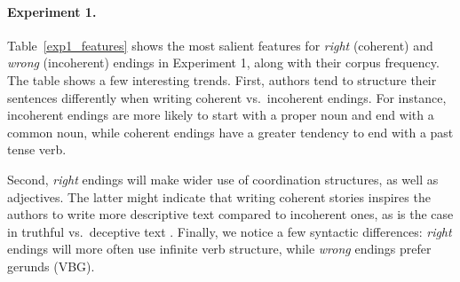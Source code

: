 \documentclass[11pt,a4paper]{article}
\newcommand{\tabref}[1]{Table~\ref{#1}}
\newcommand{\com}[1]{}
\newcommand{\resolved}[1]{}
\newcommand{\roy}[1]{{\color{orange}\textsc{[#1 --rs]}}}
\newcommand{\yc}[1]{{\color{bblue}\{\textit{#1}\}$_{yc}$}}
\renewcommand{\roy}[1]{{\color{orange}[#1 --rs]}}
\renewcommand{\roy}[1]{#1}
\renewcommand{\yc}[1]{}
\begin{document}
{\paragraph{Experiment 1.}
\tabref{exp1_features} shows the most salient features for {\it right} (coherent) and {\it wrong} (incoherent) endings in Experiment 1,
along with their corpus frequency. 
The table shows a few interesting trends. 
First, authors tend to structure their sentences differently when writing {coherent}  vs.~{incoherent} endings.
For instance, {incoherent} endings are more likely to start with a proper noun and end with a common noun, 
while coherent endings have a greater tendency to end with a past tense verb.

Second, {\it right} endings will make wider use of coordination structures, as well as adjectives.
The latter might indicate that writing coherent stories inspires the authors to write more descriptive text compared to incoherent ones, 
as is the case in truthful vs.~deceptive text \cite{ott2011finding}.
Finally, we notice a few syntactic differences: {\it right} endings will more often use infinite verb structure, while {\it wrong} endings prefer gerunds (VBG). 


\com{More interestingly, the different writing tasks seem to impose a specific sentiment on the writer. 
Three of the top four most salient features for detecting {\it wrong} endings are variants of the verb ``hate''.
This indicates that when authors are asked to write {\it wrong} text, they tend to use negative language.

An alternative explanation to this hypothesis might be that the first four sentences of the stories in the ROC story corpus tend to be positive, and thus in order to make an ending {\it wrong}, authors adopted a negative approach. 
A similar idea was suggested in the original story cloze paper, where two sentiment-based baselines were evaluated. 
These baselines measured the relative sentiment between the ending and the previous sentences.
The performance of both these baselines was roughly chance-level, which seems to suggest that this is not entirely the case.
\resolved{\yc{Is it really because there's no statistical tendency in the original stories to have happy endings, as opposed to the alternative possibility --- the sentiment classifier used by Monstafazadeh 2016 didn't quite nail down the optimal feature encodings?}} \roy{this is definitely an option, and that's partly why I used hedging (``seems to suggest''). Tones it down a bit more.}}

}
\end{document}
